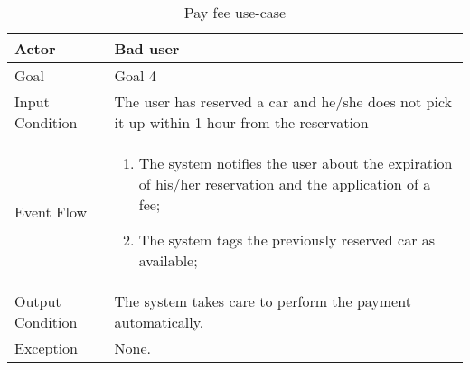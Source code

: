 \begin{table}[H]
\begin{center}
\begin{tabular}{p{} | p{}}
\hline
Actor & Bad user\\
\hline
Goal & Goal 4\\
\hline
Input Condition & The user has reserved a car and he/she does not pick it up within 1 hour from the reservation\\
\hline
Event Flow & 
\begin{enumerate}
\item The system notifies the user about the expiration of his/her reservation and the application of a fee;
\item The system tags the previously reserved car as available;
\end{enumerate} \\
\hline
Output Condition & The system takes care to perform the payment automatically.\\
\hline
Exception & None.\\
\hline
\end{tabular}
\end{center}
\caption{Pay fee use-case}
\label{apply_fee_uc}
\end{table}